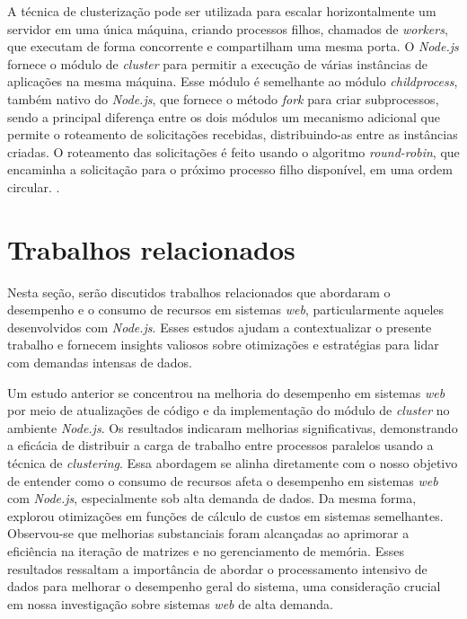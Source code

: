 \documentclass[12pt]{article}
\begin{document}
A técnica de clusterização pode ser utilizada para escalar horizontalmente um servidor em uma única máquina,
criando processos filhos, chamados de \textit{workers}, que executam de forma concorrente e compartilham uma mesma porta.
O \textit{Node.js} fornece o módulo de \textit{cluster} para permitir a execução de várias instâncias de aplicações na
mesma máquina. Esse módulo é semelhante ao módulo \textit{child\textunderscore process}, também nativo do \textit{Node.js},
que fornece o método \textit{fork} para criar subprocessos, sendo a principal diferença entre os dois módulos
um mecanismo adicional que permite o roteamento de solicitações recebidas, distribuindo-as entre as instâncias
criadas. O roteamento das solicitações é feito usando o algoritmo \textit{round-robin}, que encaminha a solicitação
para o próximo processo filho disponível, em uma ordem circular. \cite[p. 76]{DISTRIBUTEDNODE}.

\section{Trabalhos relacionados}

Nesta seção, serão discutidos trabalhos relacionados que abordaram o desempenho e o consumo de recursos 
em sistemas \textit{web}, particularmente aqueles desenvolvidos com \textit{Node.js}. Esses estudos ajudam a contextualizar 
o presente trabalho e fornecem insights valiosos sobre otimizações e estratégias para lidar com demandas 
intensas de dados.

Um estudo anterior \cite{CLUSTERTCC} se concentrou na melhoria do desempenho em sistemas \textit{web} por meio de atualizações 
de código e da implementação do módulo de \textit{cluster} no ambiente \textit{Node.js}. Os resultados indicaram melhorias 
significativas, demonstrando a eficácia de distribuir a carga de trabalho entre processos paralelos usando a 
técnica de \textit{clustering}. Essa abordagem se alinha diretamente com o nosso objetivo de entender como o consumo 
de recursos afeta o desempenho em sistemas \textit{web} com \textit{Node.js}, especialmente sob alta demanda de dados.
Da mesma forma, \cite{CLUSTERTCC} explorou otimizações em funções de cálculo de custos em sistemas 
semelhantes. Observou-se que melhorias substanciais foram alcançadas ao aprimorar a eficiência na 
iteração de matrizes e no gerenciamento de memória. Esses resultados ressaltam a importância de abordar o 
processamento intensivo de dados para melhorar o desempenho geral do sistema, uma consideração crucial em 
nossa investigação sobre sistemas \textit{web} de alta demanda.
\end{document}
